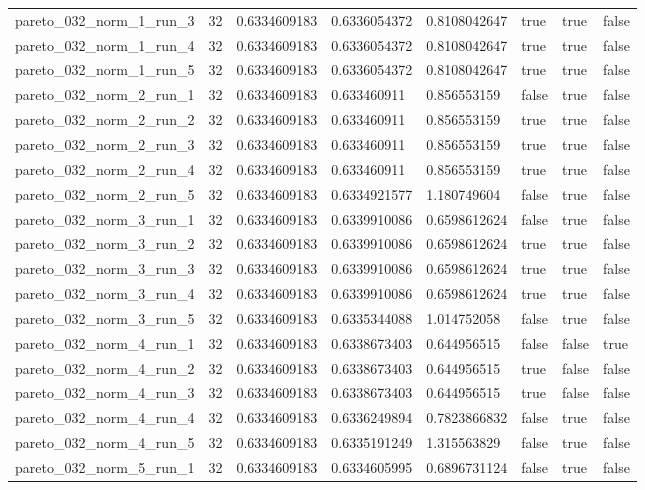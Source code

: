 \begin{tabular}{@{}llllllll@{}}
pareto\_032\_norm\_1\_run\_3 & 32 & 0.6334609183 & 0.6336054372 & 0.8108042647 & true & true & false \\
pareto\_032\_norm\_1\_run\_4 & 32 & 0.6334609183 & 0.6336054372 & 0.8108042647 & true & true & false \\
pareto\_032\_norm\_1\_run\_5 & 32 & 0.6334609183 & 0.6336054372 & 0.8108042647 & true & true & false \\
pareto\_032\_norm\_2\_run\_1 & 32 & 0.6334609183 & 0.633460911 & 0.856553159 & false & true & false \\
pareto\_032\_norm\_2\_run\_2 & 32 & 0.6334609183 & 0.633460911 & 0.856553159 & true & true & false \\
pareto\_032\_norm\_2\_run\_3 & 32 & 0.6334609183 & 0.633460911 & 0.856553159 & true & true & false \\
pareto\_032\_norm\_2\_run\_4 & 32 & 0.6334609183 & 0.633460911 & 0.856553159 & true & true & false \\
pareto\_032\_norm\_2\_run\_5 & 32 & 0.6334609183 & 0.6334921577 & 1.180749604 & false & true & false \\
pareto\_032\_norm\_3\_run\_1 & 32 & 0.6334609183 & 0.6339910086 & 0.6598612624 & false & true & false \\
pareto\_032\_norm\_3\_run\_2 & 32 & 0.6334609183 & 0.6339910086 & 0.6598612624 & true & true & false \\
pareto\_032\_norm\_3\_run\_3 & 32 & 0.6334609183 & 0.6339910086 & 0.6598612624 & true & true & false \\
pareto\_032\_norm\_3\_run\_4 & 32 & 0.6334609183 & 0.6339910086 & 0.6598612624 & true & true & false \\
pareto\_032\_norm\_3\_run\_5 & 32 & 0.6334609183 & 0.6335344088 & 1.014752058 & false & true & false \\
pareto\_032\_norm\_4\_run\_1 & 32 & 0.6334609183 & 0.6338673403 & 0.644956515 & false & false & true \\
pareto\_032\_norm\_4\_run\_2 & 32 & 0.6334609183 & 0.6338673403 & 0.644956515 & true & false & false \\
pareto\_032\_norm\_4\_run\_3 & 32 & 0.6334609183 & 0.6338673403 & 0.644956515 & true & false & false \\
pareto\_032\_norm\_4\_run\_4 & 32 & 0.6334609183 & 0.6336249894 & 0.7823866832 & false & true & false \\
pareto\_032\_norm\_4\_run\_5 & 32 & 0.6334609183 & 0.6335191249 & 1.315563829 & false & true & false \\
pareto\_032\_norm\_5\_run\_1 & 32 & 0.6334609183 & 0.6334605995 & 0.6896731124 & false & true & false \\

\end{tabular}
